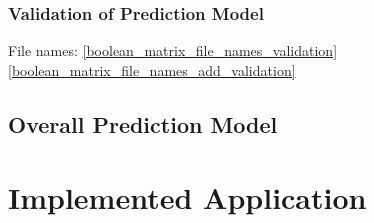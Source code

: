 \documentclass[%
a4paper,
DIV12,
2.5headlines,
bigheadings,
titlepage,
openbib,
]{scrartcl}
\begin{document}


\subsubsection{Validation of Prediction
Model}\label{validation-of-prediction-model-2}

File names:
\ref{boolean_matrix_file_names_validation}
\ref{boolean_matrix_file_names_add_validation}

\subsection{Overall Prediction
Model}\label{overall-prediction-model}


\section{Implemented Application}\label{implemented-application}
\end{document}
